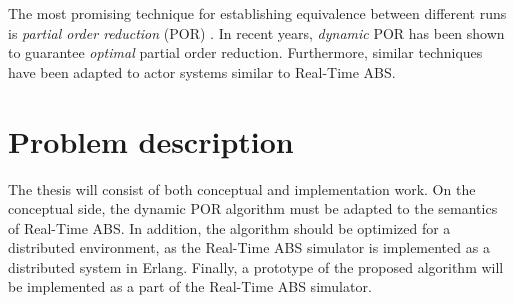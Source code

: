 \documentclass[11pt]{article}
\begin{document}
The most promising technique for establishing equivalence between different
runs is \emph{partial order reduction} (POR) \cite{DBLP:journals/sttt/ClarkeGMP99}.
In recent years, \emph{dynamic} POR \cite{DBLP:journals/jacm/AbdullaAJS17} has been
shown to guarantee \emph{optimal} partial order reduction. Furthermore, similar
techniques have been adapted to actor systems \cite{DBLP:conf/forte/AlbertAG14}
similar to Real-Time ABS.

\section*{Problem description}
\label{sec:orgbf54a93}

The thesis will consist of both conceptual and implementation work. On the
conceptual side, the dynamic POR algorithm must be adapted to the semantics
of Real-Time ABS. In addition, the algorithm should be optimized for a
distributed environment, as the Real-Time ABS simulator is implemented as a
distributed system in Erlang. Finally, a prototype of the proposed algorithm
will be implemented as a part of the Real-Time ABS simulator.

\printbibliography
\end{document}
